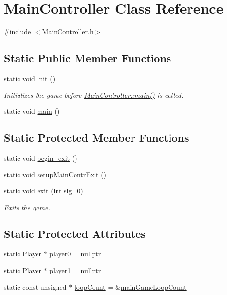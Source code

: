 \hypertarget{class_main_controller}{\section{Main\-Controller Class Reference}
\label{class_main_controller}
}


{\ttfamily \#include $<$Main\-Controller.\-h$>$}

\subsection*{Static Public Member Functions}
\begin{DoxyCompactItemize}
\item 
static void \hyperlink{class_main_controller_afb3dbf8d0314f5e5cfe50c703ed4b941}{init} ()
\begin{DoxyCompactList}\small\item\em Initializes the game before \hyperlink{class_main_controller_a98417d12903433cadd2b286bb975905a}{Main\-Controller\-::main()} is called. \end{DoxyCompactList}\item 
static void \hyperlink{class_main_controller_a98417d12903433cadd2b286bb975905a}{main} ()
\end{DoxyCompactItemize}
\subsection*{Static Protected Member Functions}
\begin{DoxyCompactItemize}
\item 
static void \hyperlink{class_main_controller_a04b64137acaa9533edf2eefc941231bf}{begin\-\_\-exit} ()
\item 
static void \hyperlink{class_main_controller_aa81c81c1c28da409b6a527e872d2ab24}{setup\-Main\-Contr\-Exit} ()
\item 
static void \hyperlink{class_main_controller_ad806bb46ae6399a8d0ca0dd1a201a550}{exit} (int sig=0)
\begin{DoxyCompactList}\small\item\em Exits the game. \end{DoxyCompactList}\end{DoxyCompactItemize}
\subsection*{Static Protected Attributes}
\begin{DoxyCompactItemize}
\item 
static \hyperlink{class_player}{Player} $\ast$ \hyperlink{class_main_controller_a778b81dc094ee4409686579d65edb1e4}{player0} = nullptr
\item 
static \hyperlink{class_player}{Player} $\ast$ \hyperlink{class_main_controller_adfc74b59bd82472bd38642e7fa8fd723}{player1} = nullptr
\item 
static const unsigned $\ast$ \hyperlink{class_main_controller_a68d914337e15b04d3160a528bb62fc1f}{loop\-Count} = \&\hyperlink{_game_state_8cpp_afbf04a84d141072dab9bf93db6c9ad29}{main\-Game\-Loop\-Count}
\end{DoxyCompactItemize}


